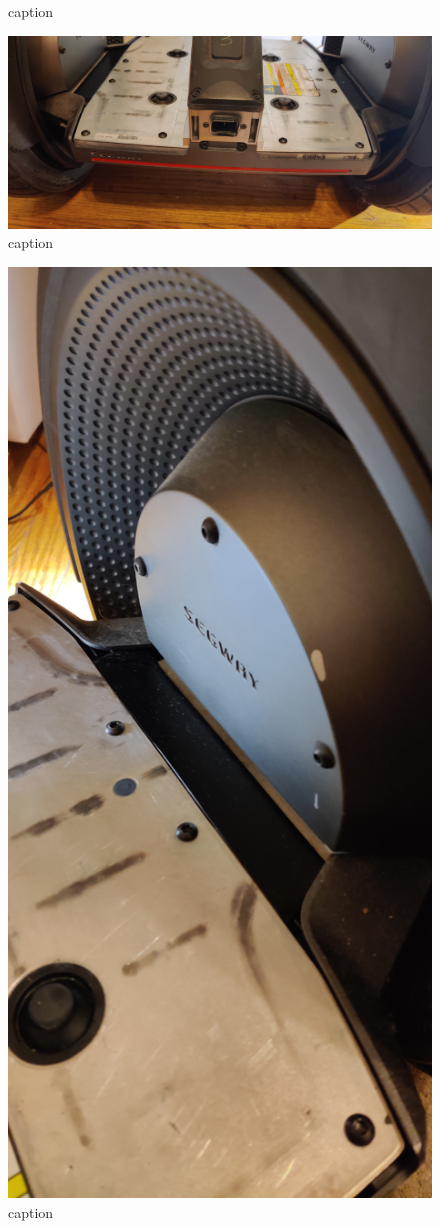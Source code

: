 \documentclass[]{formalLabReport}
\begin{document}
\begin{figure}
    \caption{caption}
    \label{fig:segwayPadsRemoved.jpg}
\end{figure}

\begin{figure}
    \includegraphics[]{segwayRear.jpg}
    \caption{caption}
    \label{fig:segwayRear.jpg}
\end{figure}

\begin{figure}
    \includegraphics[]{segwayWheelAttachment.jpg}
    \caption{caption}
    \label{fig:segwayWheelAttachment.jpg}
\end{figure}
\end{document}
